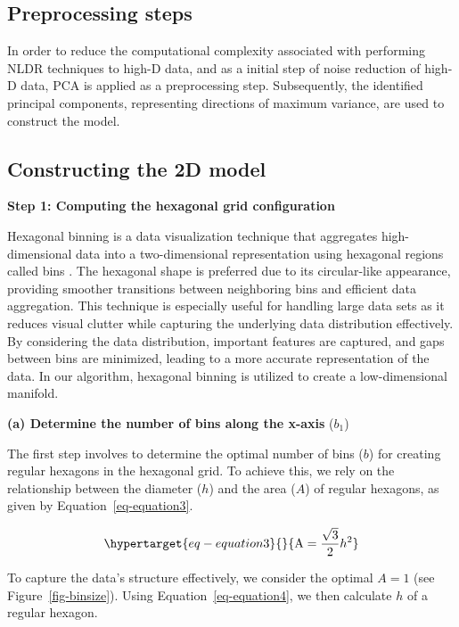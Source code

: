 \documentclass[
  12pt]{article}
\begin{document}
\hypertarget{preprocessing-steps}{%
\subsection{Preprocessing steps}\label{preprocessing-steps}}

In order to reduce the computational complexity associated with
performing NLDR techniques to high-D data, and as a initial step of
noise reduction of high-D data, PCA \citep[\citet{article68},
\citet{article69}]{article67} is applied as a preprocessing step.
Subsequently, the identified principal components, representing
directions of maximum variance, are used to construct the model.

\hypertarget{sec-construct2d}{%
\subsection{Constructing the 2D model}\label{sec-construct2d}}

\textbf{Step 1: Computing the hexagonal grid configuration}

Hexagonal binning is a data visualization technique that aggregates
high-dimensional data into a two-dimensional representation using
hexagonal regions called bins \citep{article66}. The hexagonal shape is
preferred due to its circular-like appearance, providing smoother
transitions between neighboring bins and efficient data aggregation.
This technique is especially useful for handling large data sets as it
reduces visual clutter while capturing the underlying data distribution
effectively. By considering the data distribution, important features
are captured, and gaps between bins are minimized, leading to a more
accurate representation of the data. In our algorithm, hexagonal binning
is utilized to create a low-dimensional manifold.

\textbf{(a) Determine the number of bins along the x-axis} (\(b_1\))

The first step involves to determine the optimal number of bins (\(b\))
for creating regular hexagons in the hexagonal grid. To achieve this, we
rely on the relationship between the diameter (\(h\)) and the area
(\(A\)) of regular hexagons, as given by Equation~\ref{eq-equation3}.

\begin{equation}\protect\hypertarget{eq-equation3}{}{
 \text{A} = \frac{\sqrt{3}}{2}h^2
}\label{eq-equation3}\end{equation}

To capture the data's structure effectively, we consider the optimal
\(A = 1\) (see Figure~\ref{fig-binsize}). Using
Equation~\ref{eq-equation4}, we then calculate \(h\) of a regular
hexagon.
\end{document}
